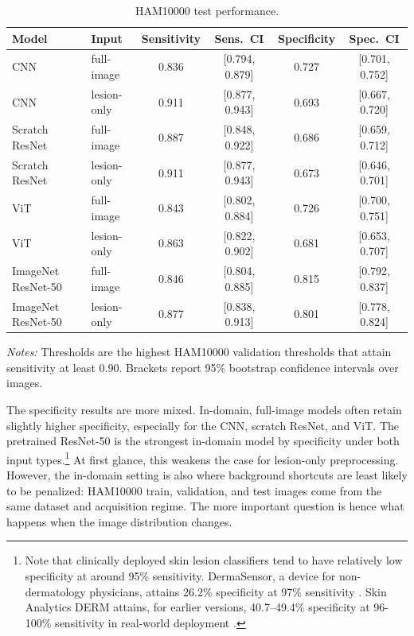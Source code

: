 \documentclass[10pt]{article}
\begin{document}
\begin{table}[t]
    \centering
    \begin{threeparttable}
    \caption{HAM10000 test performance.}
    \label{tab:ham_results}
    \footnotesize
    \begin{tabular}{llcccc}
        \toprule
        Model & Input & Sensitivity & Sens.\ CI & Specificity & Spec.\ CI \\
        \midrule
        CNN & full-image & 0.836 & [0.794, 0.879] & 0.727 & [0.701, 0.752] \\
        CNN & lesion-only & 0.911 & [0.877, 0.943] & 0.693 & [0.667, 0.720] \\
        Scratch ResNet & full-image & 0.887 & [0.848, 0.922] & 0.686 & [0.659, 0.712] \\
        Scratch ResNet & lesion-only & 0.911 & [0.877, 0.943] & 0.673 & [0.646, 0.701] \\
        ViT & full-image & 0.843 & [0.802, 0.884] & 0.726 & [0.700, 0.751] \\
        ViT & lesion-only & 0.863 & [0.822, 0.902] & 0.681 & [0.653, 0.707] \\
        ImageNet ResNet-50 & full-image & 0.846 & [0.804, 0.885] & 0.815 & [0.792, 0.837] \\
        ImageNet ResNet-50 & lesion-only & 0.877 & [0.838, 0.913] & 0.801 & [0.778, 0.824] \\
        \bottomrule
    \end{tabular}
    \begin{tablenotes}[para]
        \footnotesize
        \item \emph{Notes:} Thresholds are the highest HAM10000 validation thresholds that attain sensitivity at least 0.90. Brackets report 95\% bootstrap confidence intervals over images.
    \end{tablenotes}
    \end{threeparttable}
\end{table}

The specificity results are more mixed. In-domain, full-image models often retain slightly higher specificity, especially for the CNN, scratch ResNet, and ViT. The pretrained ResNet-50 is the strongest in-domain model by specificity under both input types.\footnote{Note that clinically deployed skin lesion classifiers tend to have relatively low specificity at around 95\% sensitivity. DermaSensor, a device for non-dermatology physicians, attains 26.2\% specificity at 97\% sensitivity \cite{manolakos2024ess}. Skin Analytics DERM attains, for earlier versions, 40.7–49.4\% specificity at 96-100\% sensitivity in real-world deployment \cite{thomas2023derm}.} At first glance, this weakens the case for lesion-only preprocessing. However, the in-domain setting is also where background shortcuts are least likely to be penalized: HAM10000 train, validation, and test images come from the same dataset and acquisition regime. The more important question is hence what happens when the image distribution changes.
\end{document}

